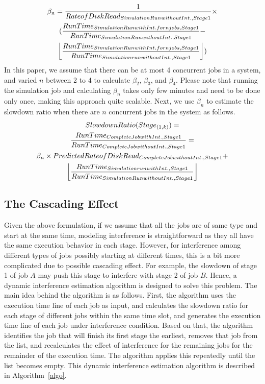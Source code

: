 \begin{equation}
\label{beta}
\begin{gathered}
\beta_{n} = \frac{1}{Rate of Disk Read_{Simulation Run without Int., Stage 1}} \times \\
(\frac{RunTime_{Simulation Run with Int. for n jobs, Stage 1}}{RunTime_{Simulation Run without Int., Stage 1}} - \\
\floor*{\frac{RunTime_{Simulation Run with Int. for n jobs, Stage 1}}{RunTime_{Simulation run without Int., Stage 1}}})
\end{gathered}
\end{equation}
\noindent
In this paper, we assume that there can be at most 4 concurrent jobs in a system, and varied $n$ between 2 to 4 to calculate $\beta_{2}$, $\beta_{3}$, and $\beta_{4}$. Please note that running the simulation job and calculating $\beta_{n}$ takes only few minutes and need to be done only once, making this approach quite scalable. Next, we use $\beta_{n}$ to estimate the slowdown ratio when there are $n$ concurrent jobs in the system as follows.
\begin{equation}
\label{slowdisk}
\begin{gathered}
SlowdownRatio(Stage_{(1,k)})=\\
\frac{RunTime_{Complete Job with Int., Stage 1}}{RunTime_{Complete Job without Int., Stage 1}} = \\
\beta_{n} \times PredictedRateofDiskRead_{Complete Job without Int., Stage 1} +\\ \floor*{\frac{Run Time_{Simulation run with Int., Stage 1}}{Run Time_{Simulation Run without Int., Stage 1}}}
\end{gathered}
\end{equation}
\subsection{The Cascading Effect}
Given the above formulation, if we assume that all the jobs are of same type and start at the same time, modeling interference is straightforward as they all have the same execution behavior in each stage. However, for interference among different types of jobs possibly starting at different times, this is a bit more complicated due to possible cascading effect. For example, the slowdown of stage 1 of job $A$ may push this stage to interfere with stage 2 of job $B$. Hence, a dynamic interference estimation algorithm is designed to solve this problem. The main idea behind the algorithm is as follows. First, the algorithm uses the execution time line of each job as input, and calculates the slowdown ratio for each stage of different jobs within the same time slot, and generates the execution time line of each job under interference condition. Based on that, the algorithm identifies the job that will finish its first stage the earliest, removes that job from the list, and recalculates the effect of interference for the remaining jobs for the remainder of the execution time. The algorithm applies this repeatedly until the list becomes empty. This dynamic interference estimation algorithm is described in Algorithm~\ref{algo}.

